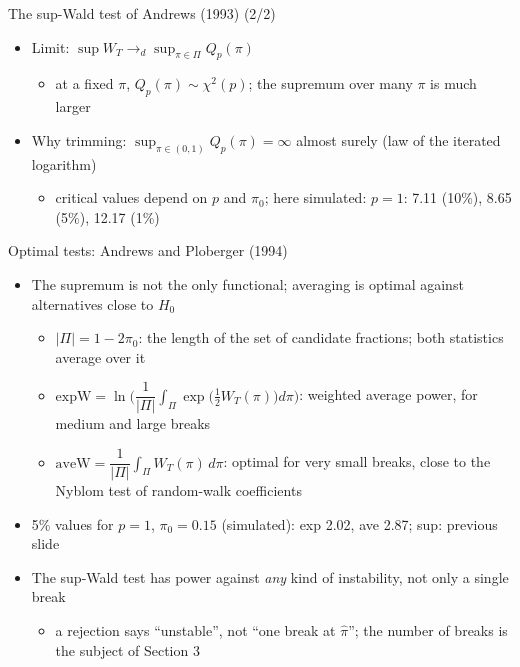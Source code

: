 \begin{frame}{The sup-Wald test of Andrews (1993) (2/2)}
\itemsize{\small}
\begin{itemize}
    \item Limit: $\sup W_T \to_d \sup_{\pi \in \Pi} Q_p(\pi)$
    \begin{itemize}
        \item at a fixed $\pi$, $Q_p(\pi) \sim \chi^2(p)$; the supremum over many $\pi$ is much larger
    \end{itemize}
    \item Why trimming: $\sup_{\pi \in (0,1)} Q_p(\pi) = \infty$ almost surely (law of the iterated logarithm)
    \begin{itemize}
        \item critical values depend on $p$ and $\pi_0$; here simulated: $p = 1$: 7.11 (10\%), 8.65 (5\%), 12.17 (1\%)
    \end{itemize}
\end{itemize}
\end{frame}

\begin{frame}{Optimal tests: Andrews and Ploberger (1994)}
\itemsize{\small}
\begin{itemize}
    \item The supremum is not the only functional; averaging is optimal against alternatives close to $H_0$ 
    \begin{itemize}
        \item $|\Pi| = 1 - 2\pi_0$: the length of the set of candidate fractions; both statistics average over it
        \item $\mathrm{expW} = \ln\Big(\dfrac{1}{|\Pi|}\displaystyle\int_\Pi \exp\big(\tfrac12 W_T(\pi)\big)d\pi\Big)$: weighted average power, for medium and large breaks
        \item $\mathrm{aveW} = \dfrac{1}{|\Pi|}\displaystyle\int_\Pi W_T(\pi)\,d\pi$: optimal for very small breaks, close to the Nyblom test of random-walk coefficients
    \end{itemize}
    \item 5\% values for $p = 1$, $\pi_0 = 0.15$ (simulated): exp 2.02, ave 2.87; sup: previous slide
    \item The sup-Wald test has power against \emph{any} kind of instability, not only a single break
    \begin{itemize}
        \item a rejection says ``unstable'', not ``one break at $\hat\pi$''; the number of breaks is the subject of Section 3
    \end{itemize}
\end{itemize}
\end{frame}

